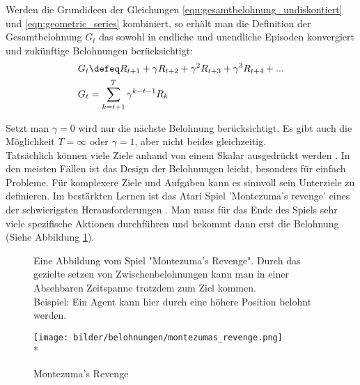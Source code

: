 \documentclass[a4paper,titlepage]{article}
\numberwithin{equation}{section} %
\begin{document}

Werden die Grundideen der Gleichungen \ref{eqn:gesamtbelohnung_undiskontiert} und \ref{eqn:geometric_series} kombiniert, so erhält man die Definition der Gesamtbelohnung $G_t$ das sowohl in endliche und unendliche Episoden konvergiert und zukünftige Belohnungen berücksichtigt:
\begin{align}
G_t &\defeq R_{t+1} + \gamma R_{t+2} + \gamma^{2}R_{t+3} + \gamma^{3}R_{t+4} + ... \nonumber \\*
G_t &= \sum_{k=t+1}^{T} \gamma^{k-t-1}R_k
\end{align}

Setzt man $\gamma=0$ wird nur die nächste Belohnung berücksichtigt. Es gibt auch die Möglichkeit $T=\infty$ oder $ \gamma=1$, aber nicht beides gleichzeitig. \\
Tatsächlich können viele Ziele anhand von einem Skalar ausgedrückt werden \cite{Sutton}. In den meisten Fällen ist das Design der Belohnungen leicht, besonders für einfach Probleme. Für komplexere Ziele und Aufgaben kann es sinnvoll sein Unterziele zu definieren. Im bestärkten Lernen ist das Atari Spiel 'Montezuma's revenge' eines der schwierigsten Herausforderungen \cite{montezuma}. Man muss für das Ende des Spiels sehr viele spezifische Aktionen durchführen und bekommt dann erst die Belohnung (Siehe Abbildung \ref{fig:montezuma}).

\begin{figure}
	\hspace{0.05\textwidth}
	\begin{minipage}{0.5\textwidth}
	\caption{Montezuma's Revenge}
	\label{fig:montezuma}
	Eine Abbildung vom Spiel "Montezuma's Revenge". Durch das gezielte setzen von Zwischenbelohnungen kann man in einer Absehbaren Zeitspanne trotzdem zum Ziel kommen. \\Beispiel: Ein Agent kann hier durch eine höhere Position belohnt werden.
\end{minipage}
\hspace{1.5mm}
\begin{minipage}{0.3\textwidth}
	\texttt{[image: bilder/belohnungen/montezumas\_revenge.png]} \\*
\end{minipage}\hspace{0.1\textwidth}
\end{figure}
\end{document}
